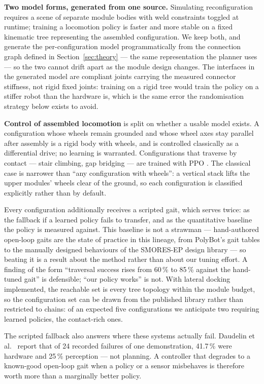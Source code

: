 \documentclass[11pt,a4paper]{article}
\begin{document}
\noindent\textbf{Two model forms, generated from one source.} Simulating
reconfiguration requires a scene of separate module bodies with weld
constraints toggled at runtime; training a locomotion policy is faster and more
stable on a fixed kinematic tree representing the assembled configuration. We
keep both, and generate the per-configuration model programmatically from the
connection graph defined in Section~\ref{sec:theory} --- the same
representation the planner uses --- so the two cannot drift apart as the module
design changes. The interfaces in the generated model are compliant joints
carrying the measured connector stiffness, not rigid fixed joints: training on
a rigid tree would train the policy on a stiffer robot than the hardware is,
which is the same error the randomisation strategy below exists to avoid.

\noindent\textbf{Control of assembled locomotion} is split on whether a usable
model exists. A configuration whose wheels remain grounded and whose wheel axes
stay parallel after assembly is a rigid body with wheels, and is controlled
classically as a differential drive; no learning is warranted. Configurations
that traverse by contact --- stair climbing, gap bridging --- are trained with
PPO \cite{schulman2017}. The classical case is narrower than ``any
configuration with wheels'': a vertical stack lifts the upper modules' wheels
clear of the ground, so each configuration is classified explicitly rather than
by default.

Every configuration additionally receives a scripted gait, which serves twice:
as the fallback if a learned policy fails to transfer, and as the quantitative
baseline the policy is measured against. This baseline is not a strawman ---
hand-authored open-loop gaits are the state of practice in this lineage, from
PolyBot's gait tables \cite{yim2003} to the manually designed behaviours of the
SMORES-EP design library \cite{jing2016,jing2018} --- so beating it is a result
about the method rather than about our tuning effort. A finding of the form
``traversal success rises from 60\,\% to 85\,\% against the hand-tuned gait''
is defensible; ``our policy works'' is not. With lateral docking implemented,
the reachable set is every tree topology within the module budget, so the
configuration set can be drawn from the published library rather than
restricted to chains: of an expected five configurations we anticipate two
requiring learned policies, the contact-rich ones.

\noindent The scripted fallback also answers where these systems actually fail.
Daudelin et al.\ \cite{daudelin2018} report that of 24 recorded failures of one
demonstration, 41.7\,\% were hardware and 25\,\% perception --- not planning. A
controller that degrades to a known-good open-loop gait when a policy or a
sensor misbehaves is therefore worth more than a marginally better policy.
\end{document}
